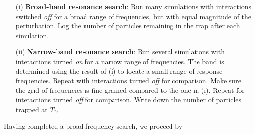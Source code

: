 \begin{itemize} %
    \item[(i)] \textbf{Broad-band resonance search}: Run many simulations with interactions switched \textit{off} for a broad range of frequencies, but with equal magnitude of the perturbation. Log the number of particles remaining in the trap after each simulation.
    \item[(ii)] \textbf{Narrow-band resonance search}: Run several simulations with interactions turned \textit{on} for a narrow range of frequencies. The band is determined using the result of (i) to locate a small range of response frequencies. Repeat with interactions turned \textit{off} for comparison. Make sure the grid of frequencies is fine-grained compared to the one in (i).  Repeat for interactions turned \textit{off} for comparison. Write down the number of particles trapped at $T_2$.
\end{itemize}
Having completed a broad frequency search, we proceed by 








































